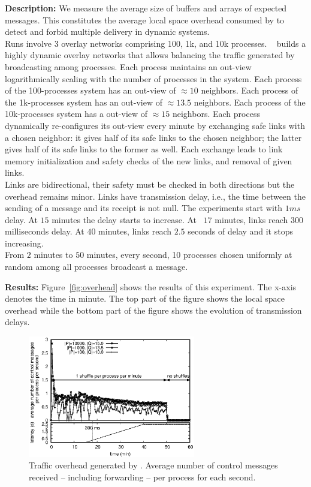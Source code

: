 \noindent \textbf{Description:} We measure the average size of buffers and
arrays of expected messages. This constitutes the average local space overhead
consumed by \RPCBROADCAST to detect and forbid multiple delivery in dynamic
systems.\\
Runs involve 3 overlay networks comprising 100, 1k, and 10k
processes. \SPRAY~\cite{nedelec2017adaptive} builds a highly dynamic overlay
networks that allows balancing the traffic generated by broadcasting among
processes. Each process maintains an out-view logarithmically scaling with the
number of processes in the system. Each process of the 100-processes system has
an out-view of $\approx 10$ neighbors. Each process of the 1k-processes system
has an out-view of $\approx 13.5$ neighbors. Each process of the 10k-processes
system has a out-view of $\approx 15$ neighbors. Each process dynamically
re-configures its out-view every minute by exchanging safe links with a chosen
neighbor: it gives half of its safe links to the chosen neighbor; the latter
gives half of its safe links to the former as well. Each exchange leads to link
memory initialization and safety checks of the new links,
and removal of given links.\\
Links are bidirectional, their safety must be checked in both directions but the
overhead remains minor. Links have transmission delay, i.e., the time between
the sending of a message and its receipt is not null. The experiments start with
$1ms$ delay. At $15$ minutes the delay starts to increase. At ~$17$ minutes,
links reach $300$ milliseconds delay. At $40$ minutes,
links reach $2.5$ seconds of delay and it stops increasing.\\
From $2$ minutes to $50$ minutes, every second, 10 processes chosen uniformly at
random among all processes broadcast a message.

\noindent \textbf{Results:} Figure~\ref{fig:overhead} shows the results of this
experiment. The x-axis denotes the time in minute. The top part of the figure
shows the local space overhead while the bottom part of the figure shows the
evolution of transmission delays.

\begin{figure}
  \begin{center}
    \includegraphics[width=0.65\textwidth]{./img/controlmessages.eps}
    \caption{\label{fig:controlmessages}Traffic overhead generated by
      \RPCBROADCAST.  Average number of control messages received -- including
      forwarding -- per process for each second.}
  \end{center}
\end{figure}



